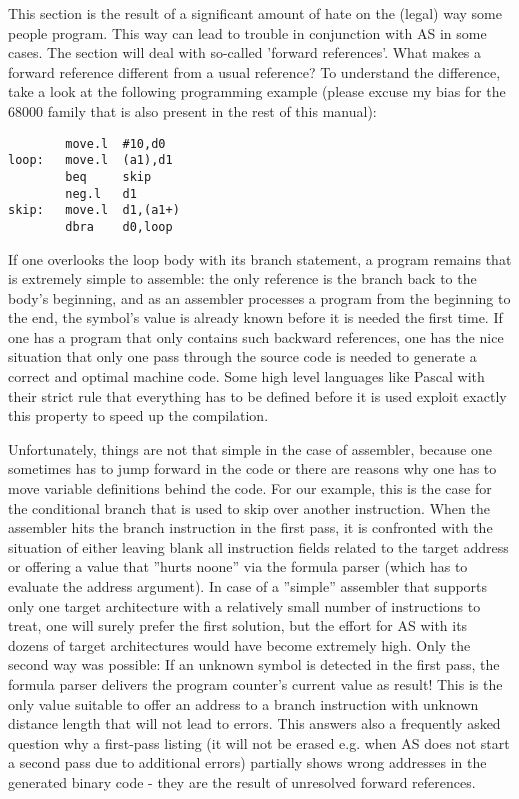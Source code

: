 \documentclass[12pt,twoside]{report}
\newcommand{\asname}{{AS}}
\begin{document}
This section is the result of a significant amount of hate on the
(legal) way some people program.  This way can lead to trouble in
conjunction with \asname{} in some cases.  The section will deal with
so-called 'forward references'.  What makes a forward reference
different from a usual reference?  To understand the difference, take
a look at the following programming example (please excuse my bias
for the 68000 family that is also present in the rest of this
manual):
\begin{verbatim}
        move.l  #10,d0
loop:   move.l  (a1),d1
        beq     skip
        neg.l   d1
skip:   move.l  d1,(a1+)
        dbra    d0,loop
\end{verbatim}
If one overlooks the loop body with its branch statement, a program
remains that is extremely simple to assemble: the only reference is
the branch back to the body's beginning, and as an assembler
processes a program from the beginning to the end, the symbol's value
is already known before it is needed the first time.  If one has a
program that only contains such backward references, one has the nice
situation that only one pass through the source code is needed to
generate a correct and optimal machine code.  Some high level
languages like Pascal with their strict rule that everything has to
be defined before it is used exploit exactly this property to speed
up the compilation.

Unfortunately, things are not that simple in the case of assembler,
because one sometimes has to jump forward in the code or there are
reasons why one has to move variable definitions behind the code.
For our example, this is the case for the conditional branch that is
used to skip over another instruction.  When the assembler hits the
branch instruction in the first pass, it is confronted with the
situation of either leaving blank all instruction fields related to
the target address or offering a value that ''hurts noone'' via the
formula parser (which has to evaluate the address argument).  In case
of a ''simple'' assembler that supports only one target architecture
with a relatively small number of instructions to treat, one will
surely prefer the first solution, but the effort for \asname{} with its
dozens of target architectures would have become extremely high.
Only the second way was possible: If an unknown symbol is detected in
the first pass, the formula parser delivers the program counter's
current value as result!  This is the only value suitable to offer an
address to a branch instruction with unknown distance length that
will not lead to errors.  This answers also a frequently asked
question why a first-pass listing (it will not be erased e.g. when \asname{}
does not start a second pass due to additional errors) partially
shows wrong addresses in the generated binary code - they are the
result of unresolved forward references.
\end{document}

